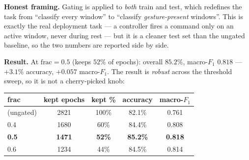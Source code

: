 \documentclass[11pt,a4paper]{article}
\newcommand{\up}[1]{\textcolor{good}{$+#1$}}
\newcommand{\fone}{$F_1$}
\begin{document}
\textbf{Honest framing.} Gating is applied to \emph{both} train and test, which
redefines the task from ``classify every window'' to ``classify
\emph{gesture-present} windows''. This is exactly the real deployment task --- a
controller fires a command only on an active window, never during rest --- but it
is a cleaner test set than the ungated baseline, so the two numbers are reported
side by side.

\textbf{Result.} At $\text{frac}=0.5$ (keeps $52\%$ of epochs):
overall $\mathbf{85.2\%}$, macro-\fone{} $\mathbf{0.818}$ ---
\up{3.1\%} accuracy, \up{0.057} macro-\fone{}. The result is \emph{robust} across
the threshold sweep, so it is not a cherry-picked knob:

\begin{center}\small
\begin{tabular}{@{}lcccc@{}}
\toprule
frac & kept epochs & kept \% & accuracy & macro-\fone{} \\
\midrule
(ungated) & 2821 & 100\% & 82.1\% & 0.761 \\
0.4 & 1680 & 60\% & 84.4\% & 0.808 \\
\textbf{0.5} & \textbf{1471} & \textbf{52\%} & \textbf{85.2\%} & \textbf{0.818} \\
0.6 & 1234 & 44\% & 84.5\% & 0.814 \\
\bottomrule
\end{tabular}
\end{center}
\end{document}
